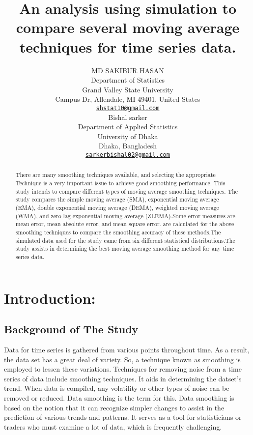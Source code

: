 \documentclass{article}
\title{An analysis using simulation to compare several moving average
techniques for time series data.}
\author{
    MD SAKIBUR HASAN
   \\
    Department of Statistics \\
    Grand Valley State University \\
  Campus Dr, Allendale, MI 49401, United States \\
  \texttt{\href{mailto:shstat10@gmail.com}{\nolinkurl{shstat10@gmail.com}}} \\
   \And
    Bishal sarker
   \\
    Department of Applied Statistics \\
    University of Dhaka \\
  Dhaka, Bangladesh \\
  \texttt{\href{mailto:sarkerbishal02@gmail.com}{\nolinkurl{sarkerbishal02@gmail.com}}} \\
  }
\begin{document}
\maketitle


\begin{abstract}
There are many smoothing techniques available, and selecting the
appropriate Technique is a very important issue to achieve good
smoothing performance. This study intends to compare different types of
moving average smoothing techniques. The study compares the simple
moving average (SMA), exponential moving average (EMA), double
exponential moving average (DEMA), weighted moving average (WMA), and
zero-lag exponential moving average (ZLEMA).Some error measures are mean
error, mean absolute error, and mean square error. are calculated for
the above smoothing techniques to compare the smoothing accuracy of
these methods.The simulated data used for the study came from six
different statistical distributions.The study assists in determining the
best moving average smoothing method for any time series data.
\end{abstract}


\hypertarget{introduction}{%
\section{Introduction:}\label{introduction}}

\hypertarget{background-of-the-study}{%
\subsection{Background of The Study}\label{background-of-the-study}}

Data for time series is gathered from various points throughout time. As
a result, the data set has a great deal of variety. So, a technique
known as smoothing is employed to lessen these variations. Techniques
for removing noise from a time series of data include smoothing
techniques. It aids in determining the datset's trend. When data is
compiled, any volatility or other types of noise can be removed or
reduced. Data smoothing is the term for this. Data smoothing is based on
the notion that it can recognize simpler changes to assist in the
prediction of various trends and patterns. It serves as a tool for
statisticians or traders who must examine a lot of data, which is
frequently challenging.
\end{document}
